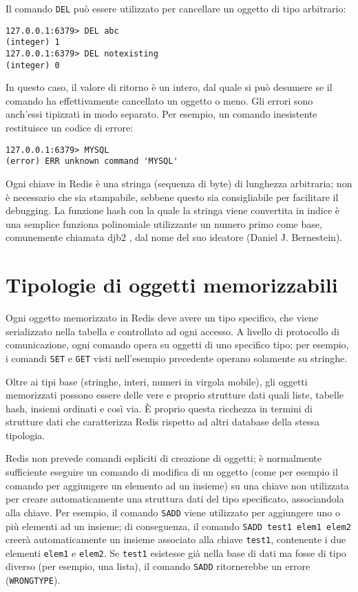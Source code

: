 Il comando \verb|DEL| può essere utilizzato per cancellare un oggetto di tipo
arbitrario:

\medskip
\begin{lstlisting}
127.0.0.1:6379> DEL abc
(integer) 1
127.0.0.1:6379> DEL notexisting
(integer) 0
\end{lstlisting}

In questo caso, il valore di ritorno è un intero, dal quale si può desumere se il comando
ha effettivamente cancellato un oggetto o meno. Gli errori sono anch'essi tipizzati in
modo separato. Per esempio, un comando inesistente restituisce un codice di errore:

\medskip
\begin{lstlisting}
127.0.0.1:6379> MYSQL
(error) ERR unknown command 'MYSQL'
\end{lstlisting}

Ogni chiave in Redis è una stringa (sequenza di byte) di lunghezza arbitraria; non è
necessario che sia stampabile, sebbene questo sia consigliabile per facilitare il
debugging. La funzione hash con la quale la stringa viene convertita in indice è
una semplice funziona polinomiale utilizzante un numero primo come base, 
comunemente chiamata djb2 \cite{djbhash}, dal nome del suo ideatore (Daniel J. Bernestein).

\section{Tipologie di oggetti memorizzabili}

Ogni oggetto memorizzato in Redis deve avere un tipo specifico, che viene serializzato
nella tabella e controllato ad ogni accesso. A livello di protocollo di comunicazione,
ogni comando opera su oggetti di uno specifico tipo; per esempio, i comandi \verb|SET|
e \verb|GET| visti nell'esempio precedente operano solamente su stringhe.

Oltre ai tipi base (stringhe, interi, numeri in virgola mobile), gli oggetti memorizzati
possono essere delle vere e proprio strutture dati quali liste, tabelle hash, insiemi
ordinati e così via. È proprio questa ricchezza in termini di strutture dati che caratterizza
Redis rispetto ad altri database della stessa tipologia.

Redis non prevede comandi espliciti di creazione di oggetti; è normalmente sufficiente
eseguire un comando di modifica di un oggetto (come per esempio il comando per aggiungere
un elemento ad un insieme) su una chiave non utilizzata per creare automaticamente una
struttura dati del tipo specificato, associandola alla chiave. Per esempio, il comando
\verb|SADD| viene utilizzato per aggiungere uno o più elementi ad un insieme; di
conseguenza, il comando \verb|SADD test1 elem1 elem2| creerà automaticamente un insieme 
associato alla chiave \verb|test1|, contenente i due elementi \verb|elem1| e \verb|elem2|.
Se \verb|test1| esistesse già nella base di dati ma fosse di tipo diverso (per esempio,
una lista), il comando \verb|SADD| ritornerebbe un errore (\verb|WRONGTYPE|).

